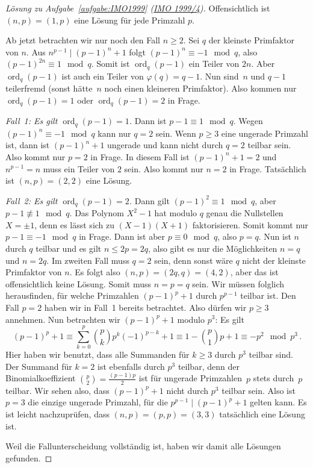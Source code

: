 \begin{proof}[Lösung zu Aufgabe~\ref{aufgabe:IMO1999} \textmd{(\href{https://artofproblemsolving.com/community/c3826_1999_imo}{IMO 1999/4})}]
	Offensichtlich ist $(n,p)=(1,p)$ eine Lösung für jede Primzahl $p$.
	
	Ab jetzt betrachten wir nur noch den Fall $n\geqslant 2$. Sei $q$ der kleinste Primfaktor von $n$. Aus $n^{p-1}\mid (p-1)^n+1$ folgt $(p-1)^n\equiv -1\mod q$, also $(p-1)^{2n}\equiv 1\mod q$. Somit ist $\operatorname{ord}_q(p-1)$ ein Teiler von $2n$. Aber $\operatorname{ord}_q(p-1)$ ist auch ein Teiler von $\varphi(q)=q-1$. Nun sind~$n$ und $q-1$ teilerfremd (sonst hätte~$n$ noch einen kleineren Primfaktor). Also kommen nur $\operatorname{ord}_q(p-1)=1$ oder $\operatorname{ord}_q(p-1)=2$ in Frage. 
	
	\emph{Fall~1: Es gilt $\operatorname{ord}_q(p-1)=1$.} Dann ist $p-1\equiv 1\mod q$. Wegen $(p-1)^n\equiv -1\mod q$ kann nur $q=2$ sein. Wenn $p\geqslant 3$ eine ungerade Primzahl ist, dann ist $(p-1)^n+1$ ungerade und kann nicht durch $q=2$ teilbar sein. Also kommt nur $p=2$ in Frage. In diesem Fall ist $(p-1)^n+1=2$ und $n^{p-1}=n$ muss ein Teiler von $2$ sein. Also kommt nur $n=2$ in Frage. Tatsächlich ist $(n,p)=(2,2)$ eine Lösung.
	
	\emph{Fall~2: Es gilt $\operatorname{ord}_q(p-1)=2$.} Dann gilt $(p-1)^2\equiv 1\mod q$, aber $p-1\not\equiv1\mod q$. Das Polynom $X^2-1$ hat modulo $q$ genau die Nullstellen $X=\pm 1$, denn es lässt sich zu $(X-1)(X+1)$ faktorisieren. Somit kommt nur $p-1\equiv -1\mod q$ in Frage. Dann ist aber $p\equiv 0\mod q$, also $p=q$. Nun ist $n$ durch $q$ teilbar und es gilt $n\leqslant 2p=2q$, also gibt es nur die Möglichkeiten $n=q$ und $n=2q$. Im zweiten Fall muss $q=2$ sein, denn sonst wäre $q$ nicht der kleinste Primfaktor von $n$. Es folgt also $(n,p)=(2q,q)=(4,2)$, aber das ist offensichtlich keine Lösung. Somit muss $n=p=q$ sein. Wir müssen folglich herausfinden, für welche Primzahlen $(p-1)^p+1$ durch $p^{p-1}$ teilbar ist. Den Fall $p=2$ haben wir in Fall~1 bereits betrachtet. Also dürfen wir $p\geqslant 3$ annehmen. Nun betrachten wir $(p-1)^p+1$ modulo $p^3$: Es gilt
	\begin{equation*}
		(p-1)^p+1\equiv \sum_{k=0}^p\binom{p}{k}p^k(-1)^{p-k}+1\equiv 1-\binom{p}{1}p+1\equiv -p^2\mod p^3\,.
	\end{equation*}
	Hier haben wir benutzt, dass alle Summanden für $k\geqslant 3$ durch $p^3$ teilbar sind. Der Summand für $k=2$ ist ebenfalls durch $p^3$ teilbar, denn der Binomialkoeffizient $\binom{p}{2}=\frac{(p-1)p}{2}$ ist für ungerade Primzahlen~$p$ stets durch~$p$ teilbar. Wir sehen also, dass $(p-1)^p+1$ nicht durch $p^3$ teilbar sein. Also ist $p=3$ die einzige ungerade Primzahl, für die $p^{p-1}\mid (p-1)^p+1$ gelten kann. Es ist leicht nachzuprüfen, dass $(n,p)=(p,p)=(3,3)$ tatsächlich eine Lösung ist.
	
	Weil die Fallunterscheidung vollständig ist, haben wir damit alle Lösungen gefunden.
\end{proof}

